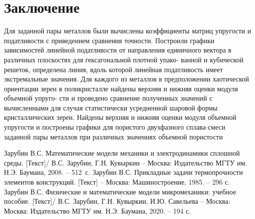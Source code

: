 \documentclass[12pt,a4paper]{article}
\begin{document}
    \section{Заключение}

    Для заданной пары металлов были вычислены коэффициенты матриц упругости и податливости с приведением сравнения точности. Построили графики зависимостей линейной податливости от направления единичного вектора в различных плоскостях для гексагональной плотной упако- ванной и кубической решеток, определена линия, вдоль которой линейная податливость имеет экстремальные значения. Для каждого из металлов в предположении хаотической ориентации зерен в поликристалле найдены верхняя и нижняя оценки модуля объемной упруго- сти и проведено сравнение полученных значений с вычисленными для случая статистически усредненной шаровой формы кристаллических зерен. Найдены верхняя и нижняя оценки модуля объемной упругости и построены графики для пористого двухфазного сплава-смеси заданной пары металлов при различных значениях объемной пористости

\begin{thebibliography}{6}
	Зарубин В.С. Математические модели механики и электродинамики сплошной среды. [Текст]/ В.С. Зарубин, Г.Н. Кувыркин -- Москва: Издательство МГТУ им. Н.Э. Баумана, 2008. -- 512~с.
 Зарубин В.С. Прикладные задачи термопрочности элементов конструкций. [Текст] -- Москва: Машиностроение, 1985. -- 296 с.  
 Зарубин В.С. Физические и математические модели микромеханики: учебное пособие. [Текст]/ В.С. Зарубин, Г.Н. Кувыркин, И.Ю. Савельева -- Москва: Москва: Издательство МГТУ им. Н.Э. Баумана, 2020. -- 194 с.
\end{thebibliography}
\end{document}
